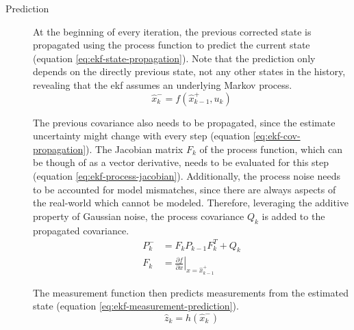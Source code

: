 \begin{description}
\item[Prediction] At the beginning of every iteration, the previous corrected state is propagated using the process function to predict the current state (equation \ref{eq:ekf-state-propagation}). Note that the prediction only depends on the directly previous state, not any other states in the history, revealing that the \gls{ekf} assumes an underlying Markov process.
\begin{equation}\label{eq:ekf-state-propagation}%
\hat{x}_k^- = f(\hat{x}_{k-1}^+, u_k)%
\end{equation}

The previous covariance also needs to be propagated, since the estimate uncertainty might change with every step (equation \ref{eq:ekf-cov-propagation}). The Jacobian matrix $F_k$ of the process function, which can be though of as a vector derivative, needs to be evaluated for this step (equation \ref{eq:ekf-process-jacobian}). Additionally, the process noise needs to be accounted for model mismatches, since there are always aspects of the real-world which cannot be modeled. Therefore, leveraging the additive property of Gaussian noise, the process covariance $Q_k$ is added to the propagated covariance.
\begin{align}\label{eq:ekf-cov-propagation}%
P_k^- &= F_k P_{k-1} F_k^T + Q_k \\%
\label{eq:ekf-process-jacobian}%
F_k &= \left. \frac{\partial f}{\partial x} \right|_{x = \hat{x}_{k-1}^+}%
\end{align}

The measurement function then predicts measurements from the estimated state (equation \ref{eq:ekf-measurement-prediction}).
\begin{equation}\label{eq:ekf-measurement-prediction}%
\hat{z}_k = h(\hat{x}_k^-)%
\end{equation}



\end{description}
